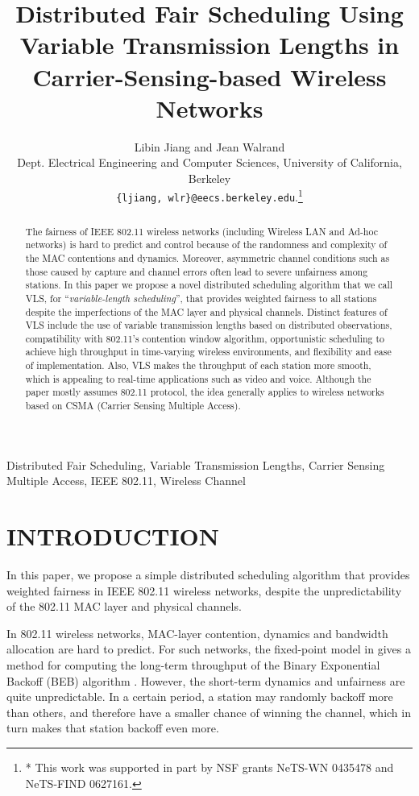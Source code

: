\documentclass[letterpaper, 10 pt, conference]{ieeeconf}
\title{\LARGE \bf
Distributed Fair Scheduling Using Variable Transmission Lengths in Carrier-Sensing-based Wireless Networks
}
\author{Libin Jiang and Jean Walrand\\Dept. Electrical Engineering and Computer Sciences, University of California, Berkeley\\{\tt\small \{ljiang, wlr\}@eecs.berkeley.edu}.\thanks{* This work was supported in part by NSF grants NeTS-WN 0435478 and NeTS-FIND 0627161.}}
\begin{document}
\maketitle
\thispagestyle{empty}
\pagestyle{empty}


\begin{abstract}

The fairness of IEEE 802.11 wireless networks (including Wireless LAN and Ad-hoc networks) is hard to predict and control because
of the randomness and complexity of the MAC contentions and dynamics. Moreover, asymmetric channel
conditions such as those caused by capture and channel errors
often lead to severe unfairness among stations.
In this paper we propose a novel distributed scheduling algorithm that we
call VLS, for ``{\em variable-length scheduling}'', that provides weighted fairness to
all stations despite the imperfections of the MAC layer and physical channels.
Distinct features of VLS include the use of variable transmission
lengths based on distributed observations, compatibility with 802.11's
contention window algorithm, opportunistic scheduling to achieve high throughput
in time-varying wireless environments, and flexibility and ease of implementation. Also, VLS makes the throughput of each station more smooth, which is appealing to real-time applications such as video and voice. 
Although the paper mostly assumes 802.11 protocol, the idea generally applies to wireless networks based on CSMA (Carrier Sensing Multiple Access).

\end{abstract}

\begin{keywords}
Distributed Fair Scheduling, Variable Transmission Lengths, Carrier Sensing Multiple Access, IEEE 802.11, Wireless Channel
\end{keywords}

\section{INTRODUCTION}

In this paper, we propose a simple distributed scheduling algorithm
that provides weighted fairness in IEEE 802.11 \cite{80211} wireless
networks, despite the unpredictability of the 802.11 MAC layer and physical
channels.

In 802.11 wireless networks, MAC-layer contention, dynamics
and bandwidth allocation are hard to predict. For such networks, the
fixed-point model in \cite{Bianchi} gives a method for computing the
long-term throughput of the Binary Exponential Backoff (BEB) algorithm
\cite{80211}. However, the short-term dynamics and unfairness are quite unpredictable. In a certain period, a station may randomly
backoff more than others, and therefore have a smaller chance of winning the
channel, which in turn makes that station backoff even more.
\end{document}
